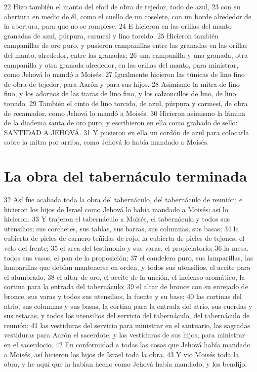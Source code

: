 22 Hizo también el manto del efod de obra de tejedor, todo de azul,
23 con su abertura en medio de él, como el cuello de un coselete, con un borde alrededor de la abertura, para que no se rompiese.
24 E hicieron en las orillas del manto granadas de azul, púrpura, carmesí y lino torcido.
25 Hicieron también campanillas de oro puro, y pusieron campanillas entre las granadas en las orillas del manto, alrededor, entre las granadas;
26 una campanilla y una granada, otra campanilla y otra granada alrededor, en las orillas del manto, para ministrar, como Jehová lo mandó a Moisés.
27 Igualmente hicieron las túnicas de lino fino de obra de tejedor, para Aarón y para sus hijos.
28 Asimismo la mitra de lino fino, y los adornos de las tiaras de lino fino, y los calzoncillos de lino, de lino torcido.
29 También el cinto de lino torcido, de azul, púrpura y carmesí, de obra de recamador, como Jehová lo mandó a Moisés.
30 Hicieron asimismo la lámina de la diadema santa de oro puro, y escribieron en ella como grabado de sello: SANTIDAD A JEHOVÁ.
31 Y pusieron en ella un cordón de azul para colocarla sobre la mitra por arriba, como Jehová lo había mandado a Moisés.

\section{La obra del tabernáculo terminada}

32 Así fue acabada toda la obra del tabernáculo, del tabernáculo de reunión; e hicieron los hijos de Israel como Jehová lo había mandado a Moisés; así lo hicieron.
33 Y trajeron el tabernáculo a Moisés, el tabernáculo y todos sus utensilios; sus corchetes, sus tablas, sus barras, sus columnas, sus basas;
34 la cubierta de pieles de carnero teñidas de rojo, la cubierta de pieles de tejones, el velo del frente;
35 el arca del testimonio y sus varas, el propiciatorio;
36 la mesa, todos sus vasos, el pan de la proposición;
37 el candelero puro, sus lamparillas, las lamparillas que debían mantenerse en orden, y todos sus utensilios, el aceite para el alumbrado;
38 el altar de oro, el aceite de la unción, el incienso aromático, la cortina para la entrada del tabernáculo;
39 el altar de bronce con su enrejado de bronce, sus varas y todos sus utensilios, la fuente y su base;
40 las cortinas del atrio, sus columnas y sus basas, la cortina para la entrada del atrio, sus cuerdas y sus estacas, y todos los utensilios del servicio del tabernáculo, del tabernáculo de reunión;
41 las vestiduras del servicio para ministrar en el santuario, las sagradas vestiduras para Aarón el sacerdote, y las vestiduras de sus hijos, para ministrar en el sacerdocio.
42 En conformidad a todas las cosas que Jehová había mandado a Moisés, así hicieron los hijos de Israel toda la obra.
43 Y vio Moisés toda la obra, y he aquí que la habían hecho como Jehová había mandado; y los bendijo.

